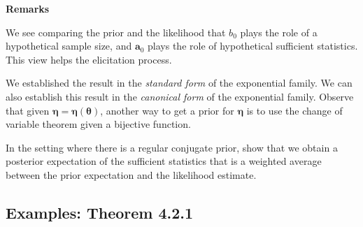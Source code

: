 \textbf{Remarks}

We see comparing the prior and the likelihood that $b_0$ plays the role of a hypothetical sample size, and $\bm{a}_0$ plays the role of hypothetical sufficient statistics. This view helps the elicitation process.

We established the result in the \textit{standard form} of the exponential family. We can also establish this result in the \textit{canonical form} of the exponential family. Observe that given $\bm{\eta}=\bm{\eta}(\bm{\theta})$, another way to get a prior for $\bm{\eta}$ is to use the change of variable theorem given a bijective function.

In the setting where there is a regular conjugate prior, \cite{diaconis1979conjugate} show that we obtain a posterior expectation of the sufficient statistics that is a weighted average between the prior expectation and the likelihood estimate. 

\subsection{Examples: Theorem 4.2.1}\label{sec421}

